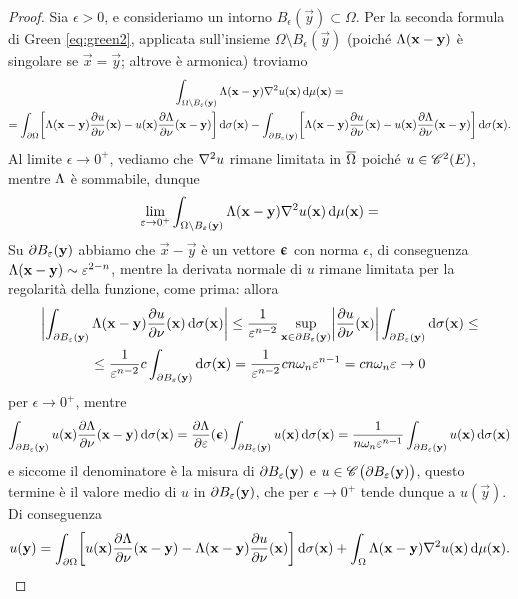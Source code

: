 \begin{proof}
    Sia $\epsilon>0$, e consideriamo un intorno $B_\epsilon(\vec y)\subset\Omega$.
    Per la seconda formula di Green \eqref{eq:green2}, applicata sull'insieme $\Omega\setminus B_\epsilon(\vec y)$ (poich\'e $\sfl(\vec x-\vec y)$ è singolare se $\vec x=\vec y$; altrove è armonica) troviamo
    \begin{multline}
        \int_{\Omega\setminus B_\epsilon(\vec y)} \sfl(\vec x-\vec y)\lap u(\vec x)\,\dd\mu(\vec x)=\\=
        \int_{\boundary\Omega} \biggl[\sfl(\vec x-\vec y)\drp{u}{\nu}(\vec x)-u(\vec x)\drp{\sfl}{\nu}(\vec x-\vec y)\biggr]\,\dd\sigma(\vec x)-
        \int_{\boundary B_\epsilon(\vec y)} \biggl[\sfl(\vec x-\vec y)\drp{u}{\nu}(\vec x)-u(\vec x)\drp{\sfl}{\nu}(\vec x-\vec y)\biggr]\,\dd\sigma(\vec x).
    \end{multline}
    Al limite $\epsilon\to 0^+$, vediamo che $\lap u$ rimane limitata in $\clos{\Omega}$ poich\'e $u\in\cont[2]{E}$, mentre $\sfl$ è sommabile, dunque
    \begin{equation}
        \lim_{\epsilon\to 0^+}\int_{\Omega\setminus B_\epsilon(\vec y)} \sfl(\vec x-\vec y)\lap u(\vec x)\,\dd\mu(\vec x)=
    \end{equation}
    Su $\boundary B_\epsilon(\vec y)$ abbiamo che $\vec x-\vec y$ è un vettore $\vepsilon$ con norma $\epsilon$, di conseguenza $\sfl(\vec x-\vec y)\sim\epsilon^{2-n}$, mentre la derivata normale di $u$ rimane limitata per la regolarità della funzione, come prima: allora
    \begin{multline}
        \abs[\bigg]{\int_{\boundary B_\epsilon(\vec y)} \sfl(\vec x-\vec y)\drp{u}{\nu}(\vec x)\,\dd\sigma(\vec x)}\le
        \frac1{\epsilon^{n-2}}\sup_{\vec x\in\boundary B_\epsilon(\vec y)}\abs[\bigg]{\drp{u}{\nu}(\vec x)}\int_{\boundary B_\epsilon(\vec y)}\dd\sigma(\vec x)\le\\\le
        \frac1{\epsilon^{n-2}}c\int_{\boundary B_\epsilon(\vec y)}\dd\sigma(\vec x)=
        \frac1{\epsilon^{n-2}}cn\omega_n\epsilon^{n-1}=
        cn\omega_n\epsilon\to 0
    \end{multline}
    per $\epsilon\to 0^+$, mentre
    \begin{equation}
        \int_{\boundary B_\epsilon(\vec y)} u(\vec x)\drp{\sfl}{\nu}(\vec x-\vec y)\,\dd\sigma(\vec x)=
        \drp{\sfl}{\epsilon}(\vepsilon)\int_{\boundary B_\epsilon(\vec y)} u(\vec x)\,\dd\sigma(\vec x)=
        \frac1{n\omega_n\epsilon^{n-1}} \int_{\boundary B_\epsilon(\vec y)}u(\vec x)\,\dd\sigma(\vec x)
    \end{equation}
    e siccome il denominatore è la misura di $\boundary B_\epsilon(\vec y)$ e $u\in\cont[][\big]{\boundary B_\epsilon(\vec y)}$, questo termine è il valore medio di $u$ in $\boundary B_\epsilon(\vec y)$, che per $\epsilon\to 0^+$ tende dunque a $u(\vec y)$.
    Di conseguenza
    \begin{equation}
        u(\vec y)=
        \int_{\boundary\Omega}\biggl[u(\vec x)\drp{\sfl}{\nu}(\vec x-\vec y)-\sfl(\vec x-\vec y)\drp{u}{\nu}(\vec x)\biggr]\,\dd\sigma(\vec x)+
        \int_\Omega \sfl(\vec x-\vec y)\lap u(\vec x)\,\dd\mu(\vec x).\qedhere
    \end{equation}
\end{proof}
